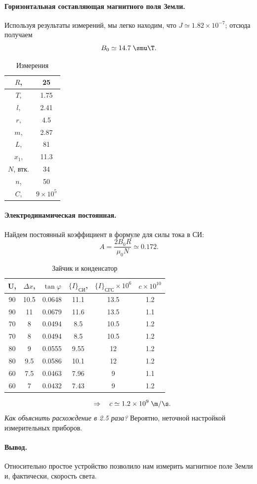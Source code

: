 \documentclass{../lab_class}
\begin{document}
\paragraph{Горизонтальная составляющая магнитного поля Земли.}
Используя результаты измерений, мы легко находим, что $J \simeq 1.82 \times 10^{-7}$; отсюда получаем
$$
	B_0 \simeq 14.7 \; \smu \T.
$$

\begin{table}[H]
\centering
\begin{tabular}{|c|c|}
			\hline
	$R$, \cm & 25   \\ \hline
	$T$, \s  & 1.75 \\ \hline
	$l$, \cm & 2.41 \\ \hline
	$r$, \mm & 4.5  \\ \hline
	$m$, \g  & 2.87 \\ \hline
	$L$, \cm & 81   \\ \hline
	$x_1$, \cm & 11.3 \\ \hline	
	$N$, втк. & 34 \\ \hline
	$n$, \hz & 50 \\ \hline
	$C$, \cm & $9 \times 10^5$ \\ \hline
\end{tabular}
\caption{Измерения}
\end{table}

\paragraph{Электродинамическая постоянная.}
Найдем постоянный коэффициент в формуле для силы тока в СИ:
$$
	A = \dfrac{2 B_0 R}{\mu_0 N} \simeq 0.172.
$$

\begin{table}[H]
\centering
\begin{tabular}{|c|c|c|c|c|c|}
			\hline
	U, \V  & $\Delta x$, \cm & $\tan{\varphi}$ & $\{ I \}_{\text{СИ}}$, \sm \A & $\{ I \}_{\text{СГС}} \times 10^6$ & $c \times 10^{10}$ \\ \hline
	90 & 10.5 & 0.0648 & 11.1 & 13.5 & 1.2 \\ \hline
	90 & 11   & 0.0679 & 11.6 & 13.5 & 1.1 \\ \hline
	70 & 8    & 0.0494 & 8.5  & 10.5 & 1.2 \\ \hline
	70 & 8    & 0.0494 & 8.5  & 10.5 & 1.2 \\ \hline
	80 & 9    & 0.0555 & 9.55 & 12   & 1.2 \\ \hline
	80 & 9.5  & 0.0586 & 10.1 & 12   & 1.2 \\ \hline
	60 & 7.5  & 0.0463 & 7.96 & 9    & 1.1 \\ \hline
	60 & 7    & 0.0432 & 7.43 & 9    & 1.2 \\ \hline
\end{tabular}
\caption{Зайчик и конденсатор}
\end{table}
$$
	\then c \simeq 1.2 \times 10^9 \; \m \text{/} \s.
$$
\emph{Как объяснить расхождение в 2.5 раза?} Вероятно, неточной настройкой измерительных приборов.

\paragraph{Вывод.}
Относительно простое устройство позволило нам измерить магнитное поле Земли и, фактически, скорость света.
\end{document}
